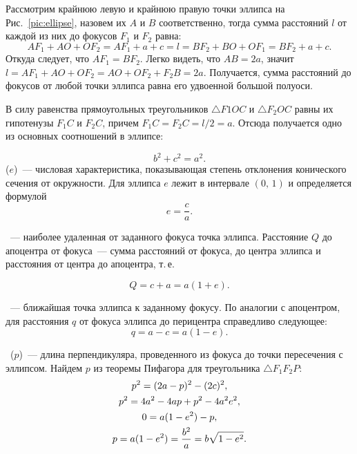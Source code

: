 Рассмотрим крайнюю левую и крайнюю правую точки эллипса на Рис.~\ref{pic:ellipse}, назовем их $A$ и $B$ соответственно, тогда сумма расстояний $l$ от каждой из них до фокусов $F_1$ и $F_2$ равна:
\begin{equation*}
	AF_1 + AO + OF_2 = AF_1 + a + c = l = BF_2 + BO + OF_1 = BF_2 + a + c.
\end{equation*}
Откуда следует, что $A F_1 = B F_2$. Легко видеть, что $AB = 2a$, значит $l = AF_1 + AO + OF_2 = AO + OF_2 + F_2B = 2a$. Получается, сумма расстояний до фокусов от любой точки эллипса равна его удвоенной большой полуоси.

В силу равенства прямоугольных треугольников $\triangle F1 O C$ и $\triangle F_2 O C$ равны их гипотенузы $F_1C$ и $F_2C$, причем $F_1C= F_2C = l/2 = a$. Отсюда получается одно из основных соотношений в эллипсе:

\begin{equation}
	b^2 + c^2 = a^2.
\end{equation}
 ($e$)~--- числовая
характеристика, показывающая степень отклонения конического сечения от окружности. Для эллипса $e$ лежит в интервале $(0, \, 1)$ и
определяется формулой
\begin{equation}
	e = \frac{c}{a}.
\end{equation}

~--- наиболее удаленная от заданного фокуса точка эллипса. Расстояние $Q$ до апоцентра от фокуса~--- сумма расстояний от фокуса, до центра эллипса и расстояния от центра до апоцентра, т.\,е.

\begin{equation}
	Q = c + a = a (1 + e).
\end{equation}

~--- ближайшая точка эллипса к заданному фокусу. По аналогии с апоцентром, для расстояния $q$ от фокуса эллипса до перицентра справедливо следующее:
\begin{equation}
	q = a - c = a (1 - e).
\end{equation}

~($p$)~--- длина перпендикуляра, проведенного из фокуса до точки пересечения с эллипсом. Найдем $p$ из теоремы Пифагора для треугольника $\triangle F_1 F_2 P$:
\begin{gather}
	p^2 = (2a - p)^2 - (2c)^2, \notag\\
	p^2 =  4a^2 - 4ap + p^2 - 4a^2e^2,\notag\\
	0 = a ( 1 - e^2) - p,\notag\\
	p = a (1 - e^2) = \frac{b^2}{a} = b \sqrt{1 - e^2}.
\end{gather}

